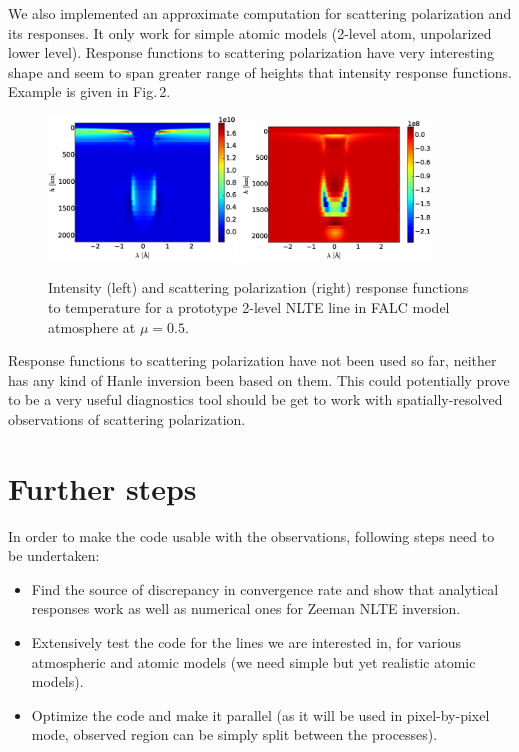 \documentclass[a4paper,10pt]{article}
\begin{document}
We also implemented an approximate computation for scattering polarization and its responses. It only work for simple atomic models (2-level atom, unpolarized lower level). Response functions to scattering polarization have very interesting shape and seem to span greater range of heights that intensity response functions. Example is given in Fig.\,2. 
\begin{figure}
 \includegraphics[width=5cm]{I.eps}
 \includegraphics[width=5cm]{Q.eps}
 \caption{Intensity (left) and scattering polarization (right) response functions to temperature for a prototype 2-level NLTE line in FALC model atmosphere at $\mu=0.5$.}
\end{figure}
Response functions to scattering polarization have not been used so far, neither has any kind of Hanle inversion been based on them. This could potentially prove to be a very useful diagnostics tool should be get to work with spatially-resolved observations of scattering polarization.

\section{Further steps}

In order to make the code usable with the observations, following steps need to be undertaken: 
\begin{itemize} 
 \item Find the source of discrepancy in convergence rate and show that analytical responses work as well as numerical ones for Zeeman NLTE inversion. 
 \item Extensively test the code for the lines we are interested in, for various atmospheric and atomic models (we need simple but yet realistic atomic models). 
 \item Optimize the code and make it parallel (as it will be used in pixel-by-pixel mode, observed region can be simply split between the processes). 
\end{itemize}
\end{document}
